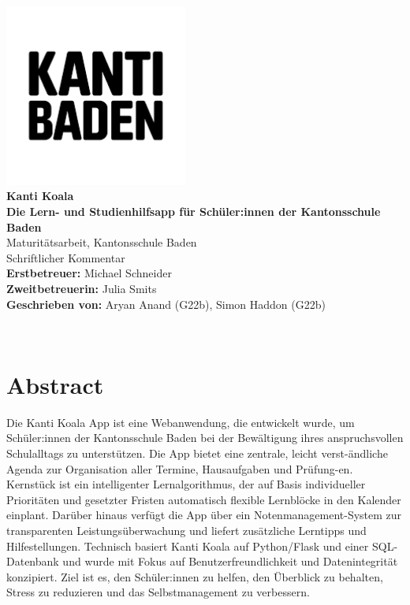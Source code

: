 \documentclass[12pt,a4paper]{report}
\begin{document}
\makeatletter
\begin{titlepage}
    \centering
    \vspace*{1cm}
       { \includegraphics[width=6cm]{img/kanti-baden.png}}\\[1cm]

    {\LARGE \textbf{Kanti Koala}}\\
    {\textbf{Die Lern- und Studienhilfsapp für Schüler:innen der Kantonsschule Baden}}\\[1cm]

    {Maturitätsarbeit, Kantonsschule Baden}\\
    {Schriftlicher Kommentar}\\[1cm]
    
    \textbf{Erstbetreuer: }{Michael Schneider}\\
    \textbf{Zweitbetreuerin: }{Julia Smits}\\[1cm]
    
    \textbf{Geschrieben von: }{Aryan Anand (G22b), Simon Haddon (G22b)}\\[1cm]
    \date{\large Datum: 11. November 2025}
    {\@date\\}
\end{titlepage}
\makeatother

\chapter*{Abstract}
Die Kanti Koala App ist eine Webanwendung, die entwickelt wurde, um Schüler:innen der Kantonsschule Baden bei der Bewältigung ihres anspruchsvollen Schulalltags zu unterstützen. 
Die App bietet eine zentrale, leicht verst-ändliche Agenda zur Organisation aller Termine, Hausaufgaben und Prüfung-en. 
Kernstück ist ein intelligenter Lernalgorithmus, der auf Basis individueller Prioritäten und gesetzter Fristen automatisch flexible Lernblöcke in den Kalender einplant. 
Darüber hinaus verfügt die App über ein Notenmanagement-System zur transparenten Leistungsüberwachung und liefert zusätzliche Lerntipps und Hilfestellungen. Technisch basiert Kanti Koala auf Python/Flask und einer SQL-Datenbank und wurde mit Fokus auf Benutzerfreundlichkeit und Datenintegrität konzipiert. Ziel ist es, den Schüler:innen zu helfen, den Überblick zu behalten, Stress zu reduzieren und das Selbstmanagement zu verbessern.
\pagebreak
\end{document}
